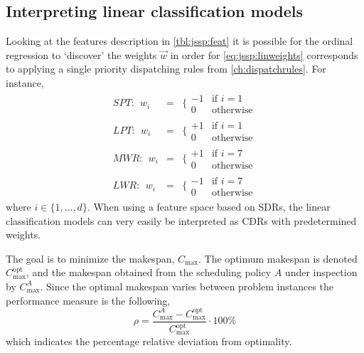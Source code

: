 \documentclass[smallextended]{svjour3}
\begin{document}
\subsection{Interpreting linear classification 
	models}\label{sec:learningmodels:interpret}
Looking at the features description in \cref{tbl:jssp:feat} it is possible for 
the ordinal regression to `discover' the weights $\vec{w}$ in order for 
\eqref{eq:jssp:linweights} corresponds to applying a single priority 
dispatching rules from \cref{ch:dispatchrules}. For instance, 
\begin{eqnarray*} %
	SPT:~~w_i&=&\bigg\{ \begin{array}{rl}-1&\text{if 
		}i=1\\0&\text{otherwise}\end{array} \\
	LPT:~~w_i&=&\bigg\{ \begin{array}{rl}+1&\text{if 
		}i=1\\0&\text{otherwise}\end{array} \\
	MWR:~~w_i&=&\bigg\{ \begin{array}{rl}+1&\text{if 
		}i=7\\0&\text{otherwise}\end{array} \\
	LWR:~~w_i&=&\bigg\{ \begin{array}{rl}-1&\text{if 
		}i=7\\0&\text{otherwise}\end{array}
\end{eqnarray*}
where $i\in\{1,\ldots,d\}$. %
When using a feature space based on SDRs, the linear classification models can 
very easily be interpreted as CDRs with predetermined weights.


The goal is to minimize the makespan, $C_{\max}$. The optimum 
makespan is denoted $C_{\max}^{\text{opt}}$, and the makespan obtained from the 
scheduling policy $A$ under inspection by $C_{\max}^{A}$. Since the optimal 
makespan varies between problem instances the performance measure is the 
following,
\begin{equation}\label{eq:ratio}
	\rho=\frac{C_{\max}^{A}-C_{\max}^{\text{opt}}}{C_{\max}^{\text{opt}}}\cdot
	100\%
\end{equation}
which indicates the percentage relative deviation from optimality. %
\end{document}
